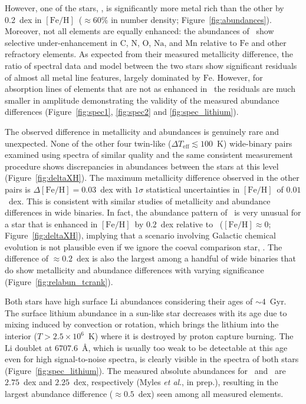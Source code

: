 \documentclass[12pt,letterpaper,margin=1in]{article}
\newcommand{\figname}{Figure}
\newcommand{\etal}{\textit{et al}.}
\newcommand*\elem[1]{\ensuremath{\mathrm{#1}}}
\newcommand*\elemH[1]{\ensuremath{[\mathrm{#1}/\elem{H}]}}
\newcommand*{\feh}{\ensuremath{\elemH{Fe}}}
\newcommand{\sunanalog}{\text{Krios}}
\newcommand{\bizarreone}{\text{Kronos}}
\begin{document}
However, one of the stars, \bizarreone, is significantly more metal rich than
the other by 0.2~dex in \feh\ ($\approx 60\%$ in number density;
\figname~\ref{fig:abundances}).
Moreover, not all elements are equally enhanced: the abundances of \bizarreone\
show selective under-enhancement in \elem{C}, \elem{N}, \elem{O}, \elem{Na},
and \elem{Mn} relative to \elem{Fe} and other refractory elements.
As expected from their measured metallicity difference, the ratio of spectral
data and model between the two stars show significant residuals of almost all
metal line features, largely dominated by \elem{Fe}.
However, for absorption lines of elements that are not as enhanced in
\bizarreone\, the residuals are much smaller in amplitude demonstrating the
validity of the measured abundance differences (\figname~\ref{fig:spec1},
\ref{fig:spec2} and \ref{fig:spec_lithium}).

The observed difference in metallicity and abundances is genuinely rare and
unexpected.
None of the other four twin-like ($\Delta T_\mathrm{eff} \lesssim 100$~K)
wide-binary pairs examined using spectra of similar quality and the same
consistent measurement procedure shows discrepancies in abundances between the
stars at this level\cite{2016ApJS..225...32B} (\figname~\ref{fig:deltaXH}).
The maximum metallicity difference observed in the other pairs is $\Delta\feh =
0.03$~dex with $1\sigma$ statistical uncertainties in \feh\ of $0.01$~dex.
This is consistent with similar studies of metallicity and abundance
differences in wide binaries\cite{Gratton:2001aa,Desidera:2004aa}.
In fact, the abundance pattern of \bizarreone\ is very unusual
for a star that is enhanced in \feh\ by $0.2$~dex relative to \sunanalog\
($\feh\approx 0$; \figname~\ref{fig:deltaXH}),
implying that a scenario involving Galactic chemical evolution is not plausible
even if we ignore the coeval comparison star, \sunanalog.
The difference of $\approx 0.2$~dex is also the largest among a handful of wide
binaries that do show metallicity and abundance differences with varying
significance\cite{Mack:2014aa,Mack:2016aa,Saffe:2015aa,
  Teske:2013aa,Teske:2015aa,Teske:2016aa,Teske:2016ab,Biazzo:2015aa,Ramirez:2015aa}
(\figname~\ref{fig:relabun_tcrank}).

Both stars have high surface \elem{Li} abundances considering
their ages of $\sim 4$~Gyr.
The surface lithium abundance in a sun-like star decreases with its age due to
mixing induced by convection or rotation, which brings the lithium into the
interior ($T>2.5 \times 10^{6}$~K) where it is destroyed by proton capture
burning. %
The \elem{Li} doublet at $6707.6$~\AA, which is usually too weak to be
detectable at this age even for high signal-to-noise spectra, is clearly
visible in the spectra of both stars (\figname~\ref{fig:spec_lithium}).
The measured absolute abundances for \bizarreone\ and \sunanalog\ are
$2.75$~dex and $2.25$~dex, respectively (Myles \etal, in prep.),
resulting in the largest abundance difference ($\approx 0.5$~dex) seen
among all measured elements.
\end{document}
